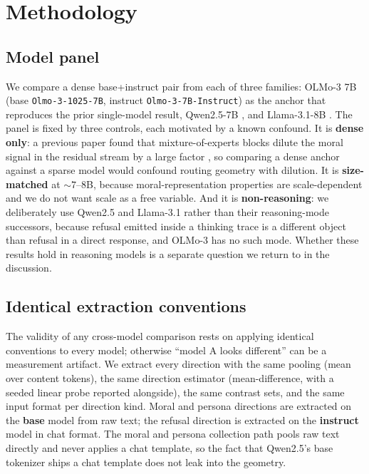 \section{Methodology}\label{methodology}

\subsection{Model panel}\label{model-panel}

We compare a dense base+instruct pair from each of three families: OLMo-3 7B
(base \texttt{Olmo-3-1025-7B}, instruct \texttt{Olmo-3-7B-Instruct}) as the anchor that
reproduces the prior single-model result, Qwen2.5-7B \citep{qwen2025qwen25}, and
Llama-3.1-8B \citep{grattafiori2024llama3}. The panel is fixed by three controls,
each motivated by a known confound. It is \textbf{dense only}: a previous paper found
that mixture-of-experts blocks dilute the moral signal in the residual stream by
a large factor \citep{reblitzrichardson2026dilution}, so comparing a dense anchor
against a sparse model would confound routing geometry with dilution. It is
\textbf{size-matched} at \({\sim}7\)--8B, because moral-representation properties are
scale-dependent \citep{reblitzrichardson2026fragility} and we do not want scale as
a free variable. And it is \textbf{non-reasoning}: we deliberately use Qwen2.5 and
Llama-3.1 rather than their reasoning-mode successors, because refusal emitted
inside a thinking trace is a different object than refusal in a direct response,
and OLMo-3 has no such mode. Whether these results hold in reasoning models is a
separate question we return to in the discussion.

\subsection{Identical extraction conventions}\label{identical-extraction-conventions}

The validity of any cross-model comparison rests on applying identical
conventions to every model; otherwise ``model A looks different'' can be a
measurement artifact. We extract every direction with the same pooling
(mean over content tokens), the same direction estimator (mean-difference, with a
seeded linear probe reported alongside), the same contrast sets, and the same
input format per direction kind. Moral and persona directions are extracted on
the \textbf{base} model from raw text; the refusal direction is extracted on the
\textbf{instruct} model in chat format. The moral and persona collection path pools
raw text directly and never applies a chat template, so the fact that Qwen2.5's
base tokenizer ships a chat template does not leak into the geometry.

